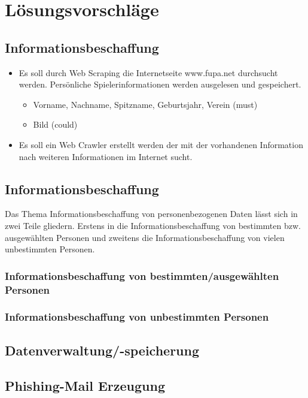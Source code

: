 
\chapter{Lösungsvorschläge}  %
\label{cha:} %
\section{Informationsbeschaffung} %

\begin{itemize}
	\item Es soll durch Web Scraping die Internetseite www.fupa.net durchsucht werden. Persönliche Spielerinformationen werden ausgelesen und gespeichert.
	\begin{itemize}
		\item Vorname, Nachname, Spitzname, Geburtsjahr, Verein (must)
		\item Bild (could)
	\end{itemize}
	\item Es soll ein Web Crawler erstellt werden der mit der vorhandenen Information nach weiteren Informationen im Internet sucht.
\end{itemize}
\section{Informationsbeschaffung}
Das Thema Informationsbeschaffung von personenbezogenen Daten lässt sich in zwei Teile gliedern. Erstens in die Informationsbeschaffung von bestimmten bzw. ausgewählten Personen und zweitens die Informationsbeschaffung von vielen unbestimmten Personen.
\subsection{Informationsbeschaffung von bestimmten/ausgewählten Personen}
\subsection{Informationsbeschaffung von unbestimmten Personen}
\section{Datenverwaltung/-speicherung}
\section{Phishing-Mail Erzeugung}